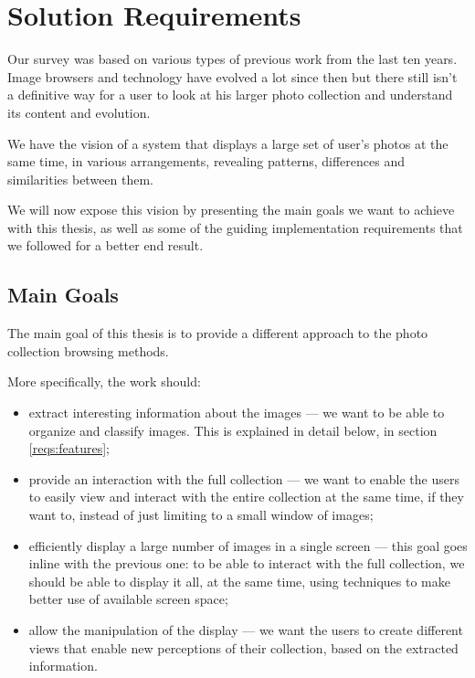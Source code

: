 \chapter{Solution Requirements} %
\label{chapter:solution_requirements}

Our survey was based on various types of previous work from the last ten years. Image browsers and technology have evolved a lot since then but there still isn't a definitive way for a user to look at his larger photo collection and understand its content and evolution.



We have the vision of a system that displays a large set of user’s photos at the same time, in various arrangements, revealing patterns, differences and similarities between them.

We will now expose this vision by presenting the main goals we want to achieve with this thesis, as well as some of the guiding implementation requirements that we followed for a better end result.





\section{Main Goals} %
\label{reqs:main_goal}

The main goal of this thesis is to provide a different approach to the photo collection browsing methods.

More specifically, the work should:

\begin{itemize}
	\item{extract interesting information about the images — we want to be able to organize and classify images. This is explained in detail below, in section \ref{reqs:features};}


	\item{provide an interaction with the full collection — we want to enable the users to easily view and interact with the entire collection at the same time, if they want to, instead of just limiting to a small window of images;}

	\item{efficiently display a large number of images in a single screen — this goal goes inline with the previous one: to be able to interact with the full collection, we should be able to display it all, at the same time, using techniques to make better use of available screen space;}

	\item{allow the manipulation of the display — we want the users to create different views that enable new perceptions of their collection, based on the extracted information.}
	
	

\end{itemize}

